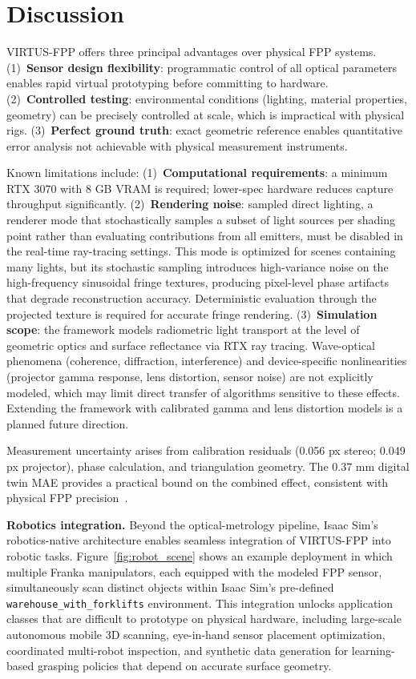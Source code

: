 \documentclass[journal,twoside,web]{ieeecolor}
\begin{document}
\section{Discussion}
\label{discussion}

VIRTUS-FPP offers three principal advantages over physical FPP systems.
(1)~\textbf{Sensor design flexibility}: programmatic control of all optical parameters enables
rapid virtual prototyping before committing to hardware.
(2)~\textbf{Controlled testing}: environmental conditions (lighting, material properties, geometry) can be precisely
controlled at scale, which is impractical with physical rigs.
(3)~\textbf{Perfect ground truth}: exact geometric reference enables quantitative error analysis
not achievable with physical measurement instruments.

Known limitations include: (1)~\textbf{Computational requirements}: a minimum RTX 3070
with 8 GB VRAM is required; lower-spec hardware reduces capture throughput significantly.
(2)~\textbf{Rendering noise}: sampled direct lighting, a renderer mode that stochastically samples a subset of light sources per shading point rather than evaluating contributions from all emitters, must be disabled in the real-time ray-tracing settings. This mode is optimized for scenes containing many lights, but its stochastic sampling introduces high-variance noise on the high-frequency sinusoidal fringe textures, producing pixel-level phase artifacts that degrade reconstruction accuracy. Deterministic evaluation through the projected texture is required for accurate fringe rendering.
(3)~\textbf{Simulation scope}: the framework models radiometric light transport at the
level of geometric optics and surface reflectance via RTX ray tracing.
Wave-optical phenomena (coherence, diffraction, interference) and device-specific
nonlinearities (projector gamma response, lens distortion, sensor noise) are not explicitly
modeled, which may limit direct transfer of algorithms sensitive to these effects.
Extending the framework with calibrated gamma and lens distortion models is a planned future
direction.

Measurement uncertainty arises from calibration residuals (0.056 px stereo; 0.049 px
projector), phase calculation, and triangulation geometry.
The 0.37 mm digital twin MAE provides a practical bound on the combined effect, consistent
with physical FPP precision~\cite{lv2023modeling}.

\textbf{Robotics integration.} Beyond the optical-metrology pipeline, Isaac Sim's robotics-native architecture enables seamless integration of VIRTUS-FPP into robotic tasks. Figure~\ref{fig:robot_scene} shows an example deployment in which multiple Franka manipulators, each equipped with the modeled FPP sensor, simultaneously scan distinct objects within Isaac Sim's pre-defined \texttt{warehouse\_with\_forklifts} environment. This integration unlocks application classes that are difficult to prototype on physical hardware, including large-scale autonomous mobile 3D scanning, eye-in-hand sensor placement optimization, coordinated multi-robot inspection, and synthetic data generation for learning-based grasping policies that depend on accurate surface geometry.
\end{document}
